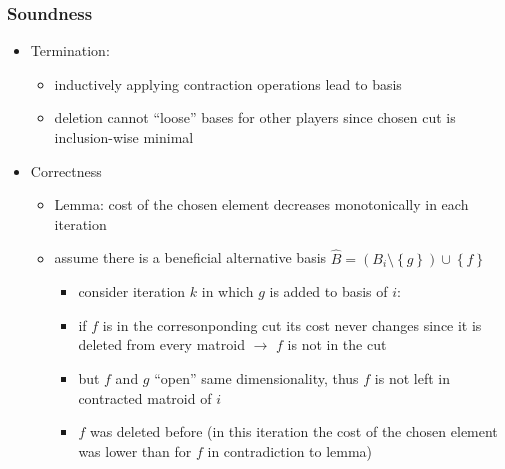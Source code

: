 \documentclass{beamer}
\newcommand{\set}[1]{\left\{#1\right\}}
\begin{document}
\begin{frame}
  \frametitle{Soundness}
  \begin{itemize}
    \item Termination:
      \begin{itemize}
        \item<2-> inductively applying contraction operations lead to basis
        \item<3-> deletion cannot \enquote{loose} bases for other players since
          chosen cut is inclusion-wise minimal
      \end{itemize}
    \item Correctness
      \begin{itemize}
        \item<4-> Lemma: cost of the chosen element decreases monotonically in each
          iteration
        \item<5-> assume there is a beneficial alternative basis
          $\hat{B} = (B_{i}\setminus\set{g})\cup{\set{f}}$
          \begin{itemize}
            \item<6-> consider iteration $k$ in which $g$ is added to basis of $i$:
            \item<7-> if $f$ is in the corresonponding cut its cost never changes
              since it is deleted from every matroid $\rightarrow$ $f$ is not
              in the cut
            \item<8-> but $f$ and $g$ \enquote{open} same dimensionality, thus $f$
              is not left in contracted matroid of $i$
            \item<9-> $f$ was deleted before (in this iteration the cost of the
              chosen element was lower than for $f$ in contradiction to lemma)
          \end{itemize}
      \end{itemize}
  \end{itemize}
\end{frame}
\end{document}
